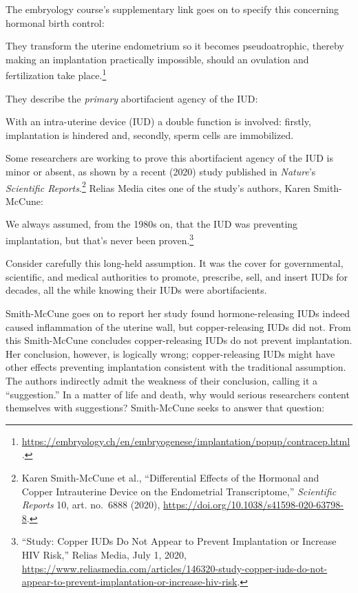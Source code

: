 \documentclass[
]{book}
\begin{document}
The embryology course's supplementary link goes on to specify this concerning hormonal birth control:

They transform the uterine endometrium so it becomes pseudoatrophic, thereby making an implantation practically impossible, should an ovulation and fertilization take place.\footnote{\url{https://embryology.ch/en/embryogenese/implantation/popup/contracep.html}.}

They describe the \emph{primary} abortifacient agency of the IUD:

With an intra-uterine device (IUD) a double function is involved: firstly, implantation is hindered and, secondly, sperm cells are immobilized.

Some researchers are working to prove this abortifacient agency of the IUD is minor or absent, as shown by a recent (2020) study published in \emph{Nature}'s \emph{Scientific Reports}.\footnote{Karen Smith-McCune et al., ``Differential Effects of the Hormonal and Copper Intrauterine Device on the Endometrial Transcriptome,'' \emph{Scientific Reports} 10, art. no.~6888 (2020), \url{https://doi.org/10.1038/s41598-020-63798-8}.} Relias Media cites one of the study's authors, Karen Smith-McCune:

We always assumed, from the 1980s on, that the IUD was preventing implantation, but that's never been proven.\footnote{``Study: Copper IUDs Do Not Appear to Prevent Implantation or Increase HIV Risk,'' Relias Media, July 1, 2020, \url{https://www.reliasmedia.com/articles/146320-study-copper-iuds-do-not-appear-to-prevent-implantation-or-increase-hiv-risk}.}

Consider carefully this long-held assumption. It was the cover for governmental, scientific, and medical authorities to promote, prescribe, sell, and insert IUDs for decades, all the while knowing their IUDs were abortifacients.

Smith-McCune goes on to report her study found hormone-releasing IUDs indeed caused inflammation of the uterine wall, but copper-releasing IUDs did not. From this Smith-McCune concludes copper-releasing IUDs do not prevent implantation. Her conclusion, however, is logically wrong; copper-releasing IUDs might have other effects preventing implantation consistent with the traditional assumption. The authors indirectly admit the weakness of their conclusion, calling it a ``suggestion.'' In a matter of life and death, why would serious researchers content themselves with suggestions? Smith-McCune seeks to answer that question:
\end{document}
